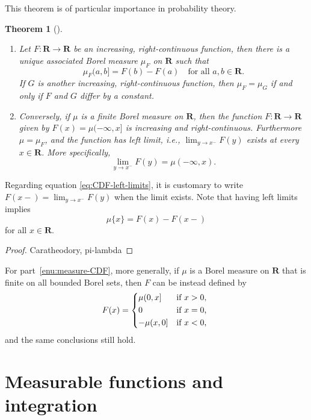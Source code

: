 \documentclass[10pt]{book}
\numberwithin{equation}{chapter}
\theoremstyle{plain-star}
\newtheorem{thm}[equation]{Theorem}
\theoremstyle{definition-star}
\theoremstyle{remark-star}
\theoremstyle{plain-star}
\newcommand{\R}{\mathbf{R}}
\begin{document}
This theorem is of particular importance in probability theory.

\begin{thm}[{\cite[Theorem~1.16]{folland1999}}] \label{thm:increasing-rcont-Borel-measure-connection} \leavevmode
    \begin{enumerate}
        \item \label{enu:CDF-measure} Let $F\colon \R \to \R$ be an increasing, right-continuous function, then there is a unique associated Borel measure $\mu_F$ on $\R$ such that \[
        \mu_F(a,b] = F(b) - F(a)\quad \text{for all }a,b\in \R.
    \] If $G$ is another increasing, right-continuous function, then $\mu_F = \mu_G$ if and only if $F$ and $G$ differ by a constant.
        \item \label{enu:measure-CDF} Conversely, if $\mu$ is a finite Borel measure on $\R$, then the function $F\colon \R \to \R$ given by $F(x) = \mu(-\infty,x]$ is increasing and right-continuous. Furthermore $\mu = \mu_F$, and the function has left limit, i.e., $\lim_{y \to x^-} F(y)$ exists at every $x \in \R$. More specifically, \begin{equation} \label{eq:CDF-left-limits}
             \lim_{y \to x^-} F(y) = \mu(-\infty,x).
        \end{equation}
    \end{enumerate}
\end{thm}

Regarding equation \eqref{eq:CDF-left-limits}, it is customary to write $F(x-) = \lim_{y \to x^-} F(y)$ when the limit exists. Note that having left limits implies \[\mu\{x\} = F(x) - F(x-)\] for all $x \in \R$.

\begin{proof}
    Caratheodory, pi-lambda
\end{proof}

    For part~\ref{enu:measure-CDF}, more generally, if $\mu$ is a Borel measure on $\R$ that is finite on all bounded Borel sets, then $F$ can be instead defined by \[
        F(x) = \begin{cases*}
            \mu (0,x] & if $x > 0$, \\
            0 & if $x = 0$, \\
            -\mu(x,0] & if $x < 0$,
        \end{cases*}
    \] and the same conclusions still hold.

\chapter{Measurable functions and integration}
\end{document}
